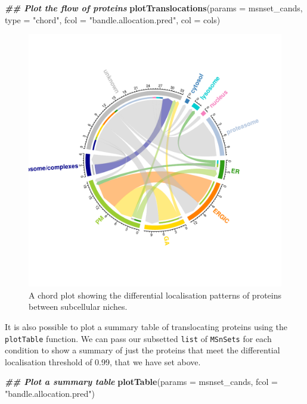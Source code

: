 \documentclass[9pt,a4paper,]{extarticle}
\newenvironment{Shaded}{\begin{snugshade}}{\end{snugshade}}
\newcommand{\AttributeTok}[1]{\textcolor[rgb]{0.13,0.29,0.53}{#1}}
\newcommand{\DocumentationTok}[1]{\textcolor[rgb]{0.56,0.35,0.01}{\textbf{\textit{#1}}}}
\newcommand{\FunctionTok}[1]{\textcolor[rgb]{0.13,0.29,0.53}{\textbf{#1}}}
\newcommand{\NormalTok}[1]{#1}
\newcommand{\StringTok}[1]{\textcolor[rgb]{0.31,0.60,0.02}{#1}}
\begin{document}
\begin{Shaded}
\begin{Highlighting}[]
\DocumentationTok{\#\# Plot the flow of proteins}
\FunctionTok{plotTranslocations}\NormalTok{(}\AttributeTok{params =}\NormalTok{ msnset\_cands,}
                   \AttributeTok{type =} \StringTok{"chord"}\NormalTok{,}
                   \AttributeTok{fcol =} \StringTok{"bandle.allocation.pred"}\NormalTok{, }
                   \AttributeTok{col =}\NormalTok{ cols)}
\end{Highlighting}
\end{Shaded}

\begin{figure}[H]

{\centering \includegraphics[width=0.7\linewidth,]{figs/circo_plot} 

}

\caption{A chord plot showing the differential localisation patterns of proteins between subcellular niches.}\label{fig:fig-chord}
\end{figure}

It is also possible to plot a summary table of translocating proteins using the
\texttt{plotTable} function. We can pass our subsetted \texttt{list} of \texttt{MSnSets} for each
condition to show a summary of just the proteins that meet the differential
localisation threshold of 0.99, that we have set above.

\begin{Shaded}
\begin{Highlighting}[]
\DocumentationTok{\#\# Plot a summary table}
\FunctionTok{plotTable}\NormalTok{(}\AttributeTok{params =}\NormalTok{ msnset\_cands,}
          \AttributeTok{fcol =}  \StringTok{"bandle.allocation.pred"}\NormalTok{)}
\end{Highlighting}
\end{Shaded}
\end{document}
